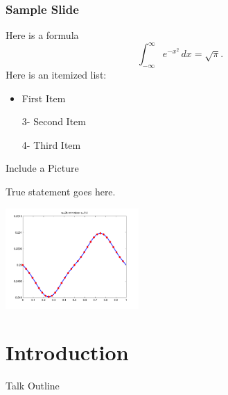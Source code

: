 \documentclass{beamer}
\begin{document}
\begin{frame}
\frametitle{Sample Slide}
Here is a formula
\[
 \int_{-\infty}^{\infty}e^{-x^2} \, dx = \sqrt{\pi}.
\]
Here is an itemized list:
\begin{itemize}
\item<2-> First Item
\item[3-] Second Item
\item[4-] Third Item
\end{itemize}

\end{frame}

\begin{frame}{Include a Picture}
\begin{theorem}
 True statement goes here.
\end{theorem}
\begin{center}
 \includegraphics[height=1.5in]{sample.pdf} %
\end{center}
\end{frame}

\section{Introduction}

\begin{frame}{Talk Outline}
\end{frame}
\end{document}
